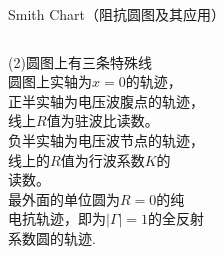 \begin{frame}{Smith Chart（阻抗圆图及其应用）}
  \begin{columns}
    \begin{column}{0.4\linewidth}
      (2)圆图上有三条特殊线\\
      圆图上实轴为$x=0$的轨迹，\\正半实轴为电压波腹点的轨迹，\\线上$R$值为驻波比读数。\\
      负半实轴为电压波节点的轨迹，\\
      线上的$R$值为行波系数$K$的\\
      读数。\\
      最外面的单位圆为$R=0$的纯\\
      电抗轨迹，即为$\lvert\Gamma\rvert=1$的全反射\\
      系数圆的轨迹.
    \end{column}
    \begin{column}{0.6\linewidth}
    \end{column}
  \end{columns}
\end{frame}

